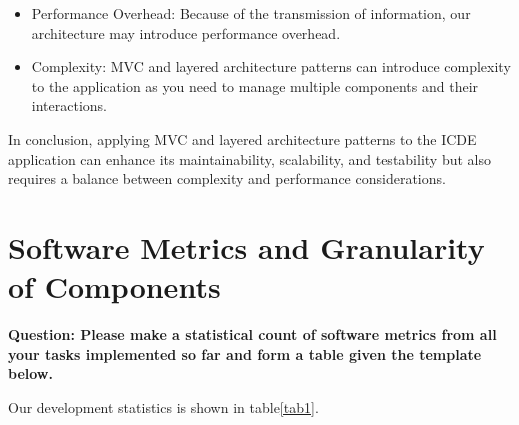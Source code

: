 \documentclass[conference]{IEEEtran}
\begin{document}
\begin{itemize}
    \item Performance Overhead: Because of the transmission of information, our architecture may introduce performance overhead.

    \item Complexity:  MVC and layered architecture patterns can introduce complexity to the application as you need to manage multiple components and their interactions.

\end{itemize}

In conclusion, applying MVC and layered architecture patterns to the ICDE application can enhance its maintainability, scalability, and testability but also requires a balance between complexity and performance considerations.


\section{\textbf{Software Metrics and Granularity of Components}}

\textbf{Question: Please make a statistical count of software metrics from all your tasks implemented so far and
form a table given the template below. }

Our development statistics is shown in table\ref{tab1}. 
\end{document}
